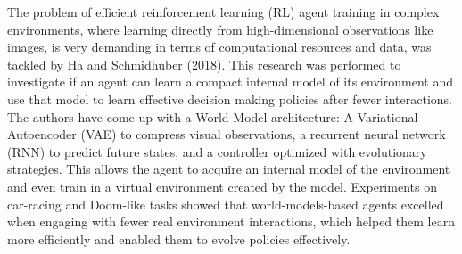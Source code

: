 \vspace{1em}
The problem of efficient reinforcement learning (RL) agent training in complex environments, where learning directly from high-dimensional observations like images, is very demanding in terms of computational resources and data, was tackled by Ha and Schmidhuber (2018)\cite{ha2018worldmodels}. This research was performed to investigate if an agent can learn a compact internal model of its environment and use that model to learn effective decision making policies after fewer interactions. The authors have come up with a World Model architecture: A Variational Autoencoder (VAE) to compress visual observations, a recurrent neural network (RNN) to predict future states, and a controller optimized with evolutionary strategies. This allows the agent to acquire an internal model of the environment and even train in a virtual environment created by the model. Experiments on car-racing and Doom-like tasks showed that world-models-based agents excelled when engaging with fewer real environment interactions, which helped them learn more efficiently and enabled them to evolve policies effectively.




